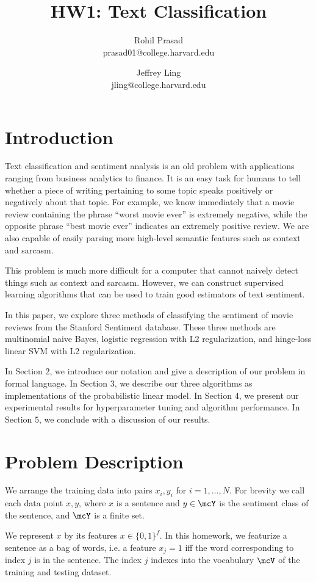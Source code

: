 \documentclass[11pt]{article}
\title{HW1: Text Classification}
\author{Rohil Prasad \\ prasad01@college.harvard.edu \and Jeffrey Ling \\ jling@college.harvard.edu }
\begin{document}
\maketitle{}
\section{Introduction}

Text classification and sentiment analysis is an old problem with applications ranging from business analytics to finance.
It is an easy task for humans to tell whether a piece of writing pertaining to some topic speaks positively or negatively about that topic. 
For example, we know immediately that a movie review containing the phrase ``worst movie ever'' is extremely negative, while the opposite phrase 
``best movie ever'' indicates an extremely positive review. We are also capable of easily parsing more high-level semantic features such as context and sarcasm.

This problem is much more difficult for a computer that cannot naively detect things such as context and sarcasm. However, we can construct supervised learning algorithms that 
can be used to train good estimators of text sentiment. 

In this paper, we explore three methods of classifying the sentiment of movie reviews from the Stanford Sentiment database. These three methods are multinomial naive Bayes, 
logistic regression with L2 regularization, and hinge-loss linear SVM with L2 regularization. 

In Section $2$, we introduce our notation and give a description of our problem in formal language. In Section $3$, we describe our three algorithms as implementations of 
the probabilistic linear model. In Section $4$, we present our experimental results for hyperparameter tuning and algorithm performance. In Section $5$, we conclude with a 
discussion of our results. 

\section{Problem Description}

We arrange the training data into pairs $x_i, y_i$ for $i = 1, \ldots, N$. For brevity we call each data point $x, y$, where $x$ is a sentence and $y \in \mcY$ is the sentiment class of the sentence, and $\mcY$ is a finite set.

We represent $x$ by its features $x \in \{0, 1\}^f$. In this homework, we featurize a sentence as a bag of words, i.e. a feature $x_j = 1$ iff the word corresponding to index $j$ is in the sentence. The index $j$ indexes into the vocabulary $\mcV$ of the training and testing dataset.
\end{document}
